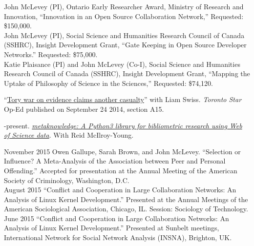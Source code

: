 \documentclass[9pt,usenames,dvipsnames]{article}
\begin{document}
\ind John McLevey (PI), Ontario Early Researcher Award, Ministry of Research and Innovation, ``Innovation in an Open Source Collaboration Network,'' Requested: \$150,000. \\

\ind John McLevey (PI), Social Science and Humanities Research Council of Canada (SSHRC), Insight Development Grant, ``Gate Keeping in Open Source Developer Networks.'' Requested: \$75,000. \\

\ind Katie Plaisance (PI) and John McLevey (Co-I), Social Science and Humanities Research Council of Canada (SSHRC), Insight Development Grant, ``Mapping the Uptake of Philosophy of Science in the Sciences,'' Requested: \$74,120. \\


\smallskip
{}

\ind ``\href{http://bit.ly/1ohSn1N}{Tory war on evidence claims another casualty}'' with Liam Swiss. \emph{Toronto Star} Op-Ed published on September 24 2014, section A15. \\

\smallskip
{}

-present. \href{http://networkslab.org/isilib/}{\emph{metaknowledge: A Python3 library for bibliometric research using Web of Science data}}. With Reid McIlroy-Young. \\

\pagebreak
{}

\ind November 2015 Owen Gallupe, Sarah Brown, and John McLevey. ``Selection or Influence? A Meta-Analysis of the Association between Peer and Personal Offending.'' Accepted for presentation at the Annual Meeting of the American Society of Criminology, Washington, D.C.\\

\ind August 2015 ``Conflict and Cooperation in Large Collaboration Networks: An Analysis of Linux Kernel Development.'' Presented at the Annual Meetings of the American Sociological Association, Chicago, IL. Session: Sociology of Technology. \\

\ind June 2015 ``Conflict and Cooperation in Large Collaboration Networks: An Analysis of Linux Kernel Development.'' Presented at Sunbelt meetings, International Network for Social Network Analysis (INSNA), Brighton, UK. \\
\end{document}
